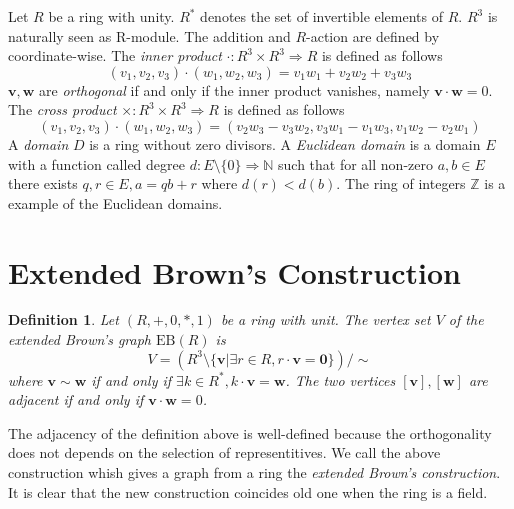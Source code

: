 \documentclass{article}
\newtheorem{Def}{Definition}
\newcommand{\Z}{\mathbb Z}
\newcommand{\N}{\mathbb N}
\newcommand{\EB}{\mathrm{EB}}
\begin{document}
\iffalse

The {\it tensor product} of two graphs $G_1=(V_1,E_1),G_2=(V_2,E_2)$ is a graph $G_1 \otimes G_2$ such that the vertex set is a cartesian product of $V_1$ and $V_2$ and two vertices $(v_1,v_2) \sim (w_1,w_2)$ if and only if $v_1 \sim v_2$ and $w_1 \sim w_2$. If $G_1, G_2$ are regular, the tensor product $G_1 \times G_2$ is also regular. 

\fi

Let $R$ be a ring with unity. 
$R^*$ denotes the set of invertible elements of $R$.
$R^3$ is naturally seen as R-module. 
The addition and $R$-action are defined by coordinate-wise.
The {\it inner product} $\cdot: R^3 \times R^3 \Rightarrow R$ is defined as follows
\[ (v_1,v_2,v_3) \cdot (w_1,w_2,w_3) = v_1 w_1 + v_2 w_2 + v_3 w_3 \]
${\bm v}, {\bm w}$ are {\it orthogonal} if and only if the inner product vanishes, namely ${\bm v} \cdot {\bm w} = 0$.
The {\it cross product} $\times: R^3 \times R^3 \Rightarrow R$ is defined as follows
\[ (v_1,v_2,v_3) \cdot (w_1,w_2,w_3) = ( v_2 w_3 - v_3 w_2, v_3 w_1 - v_1 w_3, v_1 w_2 - v_2 w_1 ) \]
A {\it domain} $D$ is a ring without zero divisors.
A {\it Euclidean domain} is a domain $E$ with a function called degree $d: E \setminus \{0\} \Rightarrow \N$ such that for all non-zero $a,b \in E$ there exists $q,r \in E, a = q b + r$ where $d(r) < d(b)$.
The ring of integers $\Z$ is a example of the Euclidean domains.


\section{Extended Brown's Construction}
\begin{Def}
Let $(R,+,0,*,1)$ be a ring with unit. The vertex set $V$ of the extended Brown's graph $\EB(R)$ is \[ V = ( R^3 \setminus \{\bm v | \exists r \in R, r \cdot {\bm v} = {\bm 0} \} ) / \sim\]
where $\bm v \sim \bm w$ if and only if $\exists k \in R^*, k \cdot {\bm v} = {\bm w}$. The two vertices $[\bm v],[\bm w]$ are adjacent if and only if ${\bm v} \cdot {\bm w} = 0$.
\end{Def}

The adjacency of the definition above is well-defined because the orthogonality does not depends on the selection of representitives. We call the above construction whish gives a graph from a ring the {\it extended Brown's construction}. It is clear that the new construction coincides old one when the ring is a field.

\iffalse
\end{document}
